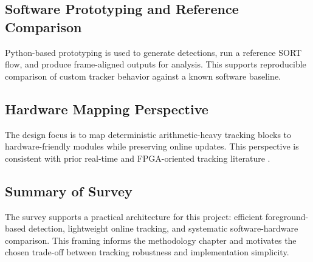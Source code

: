 \subsection{Software Prototyping and Reference Comparison}
Python-based prototyping is used to generate detections, run a reference SORT flow, and produce 
frame-aligned outputs for analysis. This supports reproducible comparison of custom tracker behavior 
against a known software baseline.

\subsection{Hardware Mapping Perspective}
The design focus is to map deterministic arithmetic-heavy tracking blocks to hardware-friendly modules 
while preserving online updates. This perspective is consistent with prior real-time and FPGA-oriented 
tracking literature \cite{Sze2017EfficientDNN, BABU2022101084}.

\subsection{Summary of Survey}
The survey supports a practical architecture for this project: efficient foreground-based detection, 
lightweight online tracking, and systematic software-hardware comparison. This framing informs the 
methodology chapter and motivates the chosen trade-off between tracking robustness and implementation 
simplicity.